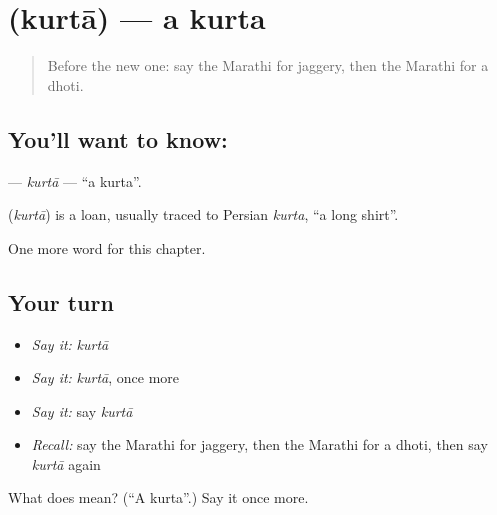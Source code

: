 \section[\texorpdfstring{\mr{कुर्ता} (kurtā)}{कुर्ता (kurtā)}]{ (kurtā) — a kurta}

\label{lesson:MR-C270-kurta}



\begin{quote}
Before the new one: say the Marathi for jaggery, then the Marathi for a dhoti.
\end{quote}

\subsection*{You'll want to know: }
\textbf{} — \emph{kurtā} — \textquotedblleft{}a kurta\textquotedblright{}.

\begin{cousinweb}
\textbf{} (\emph{kurtā}) is a loan, usually traced to Persian \emph{kurta}, \textquotedblleft{}a long shirt\textquotedblright{}.
\end{cousinweb}

\begin{grammarlens}[title={What you've built}]
One more word for this chapter.
\end{grammarlens}

\subsection*{Your turn}
\begin{itemize}
\raggedright
  \item \emph{Say it:} \emph{kurtā}
  \item \emph{Say it:} \emph{kurtā}, once more
  \item \emph{Say it:} say \emph{kurtā}
  \item \emph{Recall:} say the Marathi for jaggery, then the Marathi for a dhoti, then say \emph{kurtā} again
\end{itemize}

\begin{tcolorbox}[breakable,colback=teal!4,colframe=teal!35!black,title={Before you move on}]
What does  mean? (\textquotedblleft{}A kurta\textquotedblright{}.) Say it once more.
\end{tcolorbox}
